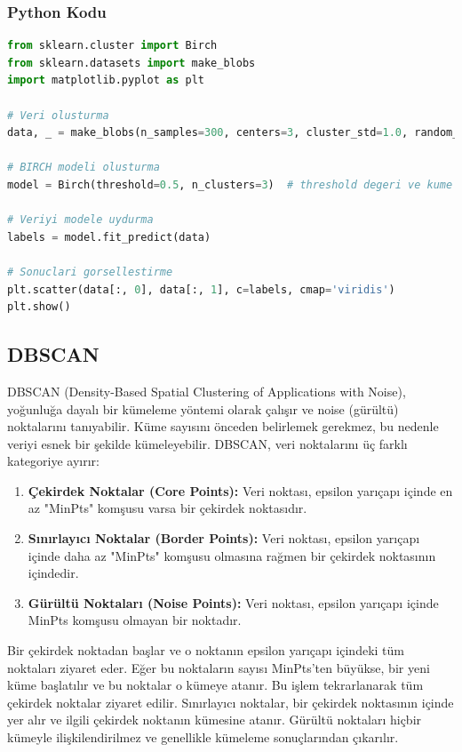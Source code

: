 \subsubsection{Python Kodu}

\begin{lstlisting}[language=Python, caption=Scikit-learn'de BIRCH.]
from sklearn.cluster import Birch
from sklearn.datasets import make_blobs
import matplotlib.pyplot as plt

# Veri olusturma
data, _ = make_blobs(n_samples=300, centers=3, cluster_std=1.0, random_state=42)

# BIRCH modeli olusturma
model = Birch(threshold=0.5, n_clusters=3)  # threshold degeri ve kume sayisini belirtin

# Veriyi modele uydurma
labels = model.fit_predict(data)

# Sonuclari gorsellestirme
plt.scatter(data[:, 0], data[:, 1], c=labels, cmap='viridis')
plt.show()
\end{lstlisting}

\newpage

\subsection{DBSCAN}
DBSCAN (Density-Based Spatial Clustering of Applications with Noise), yoğunluğa dayalı bir kümeleme yöntemi olarak çalışır ve noise (gürültü) noktalarını tanıyabilir. Küme sayısını önceden belirlemek gerekmez, bu nedenle veriyi esnek bir şekilde kümeleyebilir. DBSCAN, veri noktalarını üç farklı kategoriye ayırır:
\begin{enumerate}
    \item \textbf{Çekirdek Noktalar (Core Points):} Veri noktası, epsilon yarıçapı içinde en az "MinPts" komşusu varsa bir çekirdek noktasıdır.
    \item \textbf{Sınırlayıcı Noktalar (Border Points):} Veri noktası, epsilon yarıçapı içinde daha az "MinPts" komşusu olmasına rağmen bir çekirdek noktasının içindedir.
    \item \textbf{Gürültü Noktaları (Noise Points):} Veri noktası, epsilon yarıçapı içinde MinPts komşusu olmayan bir noktadır.
\end{enumerate}

Bir çekirdek noktadan başlar ve o noktanın epsilon yarıçapı içindeki tüm noktaları ziyaret eder. Eğer bu noktaların sayısı MinPts'ten büyükse, bir yeni küme başlatılır ve bu noktalar o kümeye atanır. Bu işlem tekrarlanarak tüm çekirdek noktalar ziyaret edilir. Sınırlayıcı noktalar, bir çekirdek noktasının içinde yer alır ve ilgili çekirdek noktanın kümesine atanır. Gürültü noktaları hiçbir kümeyle ilişkilendirilmez ve genellikle kümeleme sonuçlarından çıkarılır.

